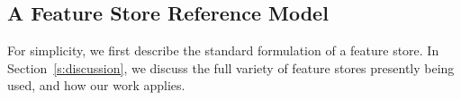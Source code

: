  
\subsection{A Feature Store Reference Model}
For simplicity, we first describe the standard formulation of a feature store. 
In Section~\ref{s:discussion}, we discuss the full variety of feature stores presently being used, and how our work applies.

